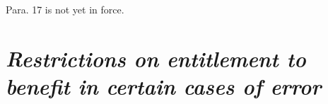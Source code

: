 \documentclass[12pt,a4paper]{article}
\begin{document}
{%
%
%
%
%
%
%
%
Para. 17 is not yet in force.

}

\section*{\itshape Restrictions on entitlement to benefit in certain cases of error}
\end{document}
